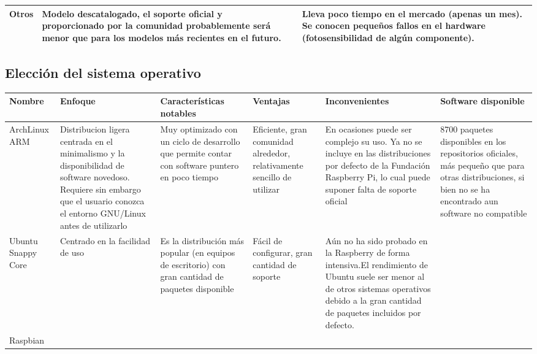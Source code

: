 \begin{landscape}
\begin{table}[h]
\begin{tabular}{|p{3cm}|p{6cm}|p{6cm}|p{6cm}|}
Otros & Modelo descatalogado, el soporte oficial y proporcionado por la comunidad probablemente será menor que para los modelos más recientes en el futuro. &  & Lleva poco tiempo en el mercado (apenas un mes). Se conocen pequeños fallos en el hardware (fotosensibilidad de algún componente).\\ \hline

\end{tabular}
\end{table}
\end{landscape}



\begin{landscape}
\subsection{Elección del sistema operativo}
\label{os:evaluation}
\begin{table}[h]
\begin{tabular}{|p{2cm}|p{4cm}|p{5cm}|p{3cm}|p{4cm}|p{4cm}|}
\hline
Nombre & Enfoque & Características notables & Ventajas & Inconvenientes & Software disponible\\ \hline
ArchLinux ARM & Distribucion ligera centrada en el minimalismo y la disponibilidad de software novedoso. Requiere sin embargo que el usuario conozca el entorno GNU/Linux antes de utilizarlo & Muy optimizado con un ciclo de desarrollo que permite contar con software puntero en poco tiempo & Eficiente, gran comunidad alrededor, relativamente sencillo de utilizar & En ocasiones puede ser complejo su uso. Ya no se incluye en las distribuciones por defecto de la Fundación Raspberry Pi, lo cual puede suponer falta de soporte oficial & 8700 paquetes disponibles en los repositorios oficiales, más pequeño que para otras distribuciones, si bien no se ha encontrado aun software no compatible\\ \hline

Ubuntu Snappy Core & Centrado en la facilidad de uso & Es la distribución más popular (en equipos de escritorio) con gran cantidad de paquetes disponible & Fácil de configurar, gran cantidad de soporte & Aún no ha sido probado en la Raspberry de forma intensiva.El rendimiento de Ubuntu suele ser menor al de otros sistemas operativos debido a la gran cantidad de paquetes incluidos por defecto. & \\ \hline 

Raspbian & & & & &\\ \hline
\end{tabular}
\end{table}
\end{landscape}

